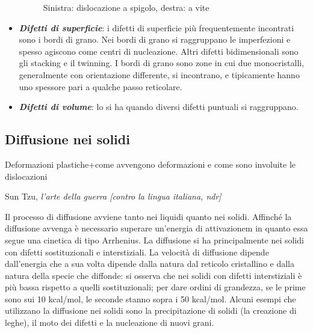 \begin{itemize}
\begin{figure}[h]
\begin{minipage}[b]{0.4\linewidth}
  \end{minipage}
  \caption{Sinistra: dislocazione a spigolo, destra: a vite}
\end{figure}
    \item \textbf{\textit{Difetti di superficie}}: i difetti di superficie più frequentemente incontrati sono i bordi di grano. Nei bordi di grano si raggruppano le imperfezioni e spesso agiscono come centri di nucleazione. Altri difetti bidimensionali sono gli stacking e il twinning. I bordi di grano sono zone in cui due monocristalli, generalmente con orientazione differente, si incontrano, e tipicamente hanno uno spessore pari a qualche passo reticolare.
    \item \textbf{\textit{Difetti di volume}}: lo si ha quando diversi difetti puntuali si raggruppano.
\end{itemize}

\subsection{Diffusione nei solidi}

\epigraph{Deformazioni plastiche+come avvengono deformazioni e come sono involuite le dislocazioni}{Sun Tzu, \textit{l'arte della guerra [contro la lingua italiana, ndr]}}

Il processo di diffusione avviene tanto nei liquidi quanto nei solidi. Affinché la diffusione avvenga è necessario superare un'energia di attivazionem in quanto essa segue una cinetica di tipo Arrhenius. 
La diffusione si ha principalmente nei solidi con difetti sostituzionali e interstiziali. La velocità di diffusione dipende dall'energia che a sua volta dipende dalla natura dal reticolo cristallino e dalla natura della specie che diffonde: si osserva che nei solidi con difetti interstiziali è più bassa rispetto a quelli sostituzionali; per dare ordini di grandezza, se le prime sono sui 10 kcal/mol, le seconde stanno sopra i 50 kcal/mol.
Alcuni esempi che utilizzano la diffusione nei solidi sono la precipitazione di solidi (la creazione di leghe), il moto dei difetti e la nucleazione di nuovi grani. 

